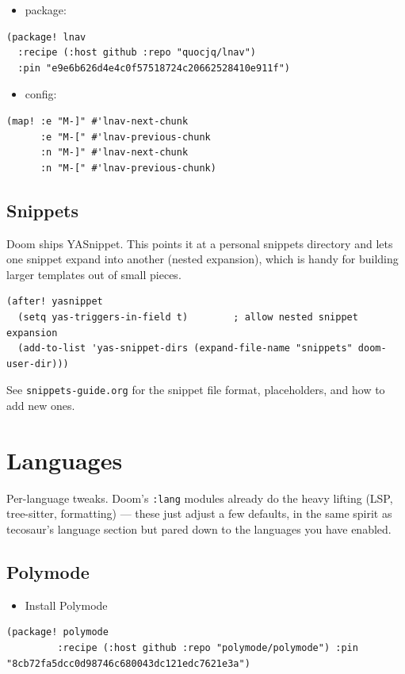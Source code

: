 \documentclass[11pt]{article}
\begin{document}
\begin{itemize}
\item package:
\end{itemize}
\begin{verbatim}
(package! lnav
  :recipe (:host github :repo "quocjq/lnav")
  :pin "e9e6b626d4e4c0f57518724c20662528410e911f")
\end{verbatim}
\begin{itemize}
\item config:
\end{itemize}
\begin{verbatim}
(map! :e "M-]" #'lnav-next-chunk
      :e "M-[" #'lnav-previous-chunk
      :n "M-]" #'lnav-next-chunk
      :n "M-[" #'lnav-previous-chunk)
\end{verbatim}
\subsection{Snippets}
\label{sec:org72253f3}
Doom ships YASnippet. This points it at a personal snippets directory
and lets one snippet expand into another (nested expansion), which is
handy for building larger templates out of small pieces.

\begin{verbatim}
(after! yasnippet
  (setq yas-triggers-in-field t)        ; allow nested snippet expansion
  (add-to-list 'yas-snippet-dirs (expand-file-name "snippets" doom-user-dir)))
\end{verbatim}

See \texttt{snippets-guide.org} for the snippet file format, placeholders,
and how to add new ones.
\section{Languages}
\label{sec:orge2a445d}
Per-language tweaks. Doom's \texttt{:lang} modules already do the heavy
lifting (LSP, tree-sitter, formatting) — these just adjust a few
defaults, in the same spirit as tecosaur's language section but pared
down to the languages you have enabled.
\subsection{Polymode}
\label{sec:org13694f4}

\begin{itemize}
\item Install Polymode
\end{itemize}
\begin{verbatim}
(package! polymode
         :recipe (:host github :repo "polymode/polymode") :pin "8cb72fa5dcc0d98746c680043dc121edc7621e3a")
\end{verbatim}
\end{document}
